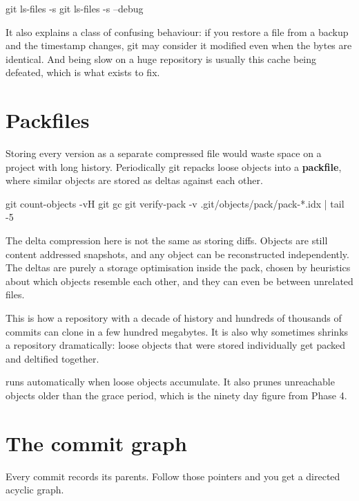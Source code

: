 \documentclass[11pt]{article}
\begin{document}
\begin{shell}
git ls-files -s
git ls-files -s --debug
\end{shell}

It also explains a class of confusing behaviour: if you restore a file from a backup
and the timestamp changes, git may consider it modified even when the bytes are
identical. And  being slow on a huge repository is usually this
cache being defeated, which is what  exists to fix.

\section{Packfiles}

Storing every version as a separate compressed file would waste space on a project
with long history. Periodically git repacks loose objects into a \textbf{packfile},
where similar objects are stored as deltas against each other.

\begin{shell}
git count-objects -vH
git gc
git verify-pack -v .git/objects/pack/pack-*.idx | tail -5
\end{shell}

\begin{deeper}
The delta compression here is not the same as storing diffs. Objects are still
content addressed snapshots, and any object can be reconstructed independently. The
deltas are purely a storage optimisation inside the pack, chosen by heuristics about
which objects resemble each other, and they can even be between unrelated files.

This is how a repository with a decade of history and hundreds of thousands of
commits can clone in a few hundred megabytes. It is also why  sometimes
shrinks a repository dramatically: loose objects that were stored individually get
packed and deltified together.
\end{deeper}

 runs automatically when loose objects accumulate. It also prunes
unreachable objects older than the grace period, which is the ninety day figure from
Phase 4.

\section{The commit graph}

Every commit records its parents. Follow those pointers and you get a directed
acyclic graph.
\end{document}
